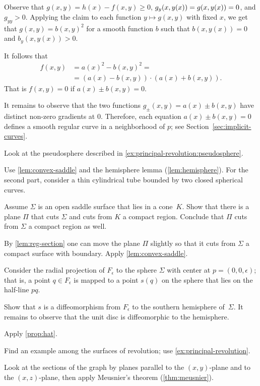 \begin{multicols}{2}
Observe that $g(x,y)=h(x)-f(x,y)\ge 0$, $g_y(x,y(x))\z=g(x,y(x))\z=0$, and $g_{yy}>0$.
Applying the claim to each function $y\mapsto g(x,y)$ with fixed $x$, we get that $g(x,y)=b(x,y)^2$ for a smooth function $b$ such that 
$b(x,y(x))=0$ and $b_y(x,y(x))>0$.

It follows that 
\begin{align*}
f(x,y)&=a(x)^2-b(x,y)^2=
\\
&=
(a(x)-b(x,y))\cdot (a(x)+b(x,y)).
\end{align*}
That is $f(x,y)=0$ if $a(x)\pm b(x,y) =0$.

It remains to observe that the two functions $g_\pm(x,y)=a(x)\pm b(x,y)$ have distinct non-zero gradients at $0$.
Therefore, each equation $a(x)\pm b(x,y) =0$ defines a smooth regular curve in a neighborhood of $p$;
see Section~\ref{sec:implicit-curves}.

 Look at the pseudosphere described in \ref{ex:principal-revolution:pseudosphere}.

Use \ref{lem:convex-saddle} and the hemisphere lemma (\ref{lem:hemisphere}).
For the second part, consider a thin cylindrical tube bounded by two closed spherical curves.

Assume $\Sigma$ is an open saddle surface that lies in a cone~$K$.
Show that there is a plane $\Pi$ that cuts $\Sigma$ and cuts from $K$ a compact region.
Conclude that $\Pi$ cuts from $\Sigma$ a compact region as well. 

By \ref{lem:reg-section} one can move the plane $\Pi$ slightly so that it cuts from $\Sigma$ a compact surface with boundary.
Apply \ref{lem:convex-saddle}.


Consider the radial projection of $F_\epsilon$ to the sphere $\Sigma$ with center at $p=(0,0,\epsilon)$;
that is, a point $q\in F_\epsilon$ is mapped to a point $s(q)$ on the sphere that lies on the half-line $pq$.

Show that $s$ is a diffeomorphism from $F_\epsilon$ to the southern hemisphere of~$\Sigma$.
It remains to observe that the unit disc is diffeomorphic to the hemisphere.

 Apply \ref{prop:hat}.

Find an example among the surfaces of revolution;
use \ref{ex:principal-revolution}.

 Look at the sections of the graph by planes parallel to the $(x,y)$-plane and to the $(x,z)$-plane, then apply Meusnier’s theorem (\ref{thm:meusnier}).


\end{multicols}
